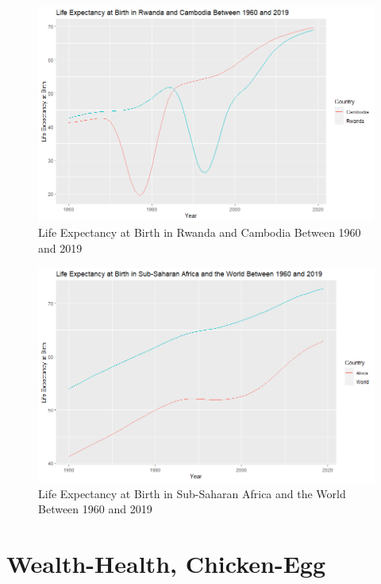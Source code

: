 \documentclass[15pt]{article}
\begin{document}
\begin{figure}[H]
    \centering
    \includegraphics[scale = 0.7]{Part3_Rwanda_Cambodia.png}
    \caption{Life Expectancy at Birth in Rwanda and Cambodia Between 1960 and 2019}
\end{figure}

\begin{figure}[H]
    \centering
    \includegraphics[scale = 0.7]{Part3_Africa.png}
    \caption{Life Expectancy at Birth in Sub-Saharan Africa and the World Between 1960 and 2019}
\end{figure}

\newpage

\section{Wealth-Health, Chicken-Egg}
\end{document}
